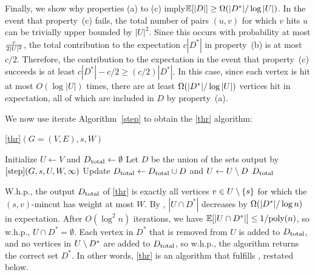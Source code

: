 Finally, we show why properties (a) to (c) imply\linebreak $\mathbb E[|D|] \ge \Omega(|D^*|/\log|U|)$. In the event that property~(c) fails, the total number of pairs $(u,v)$ for which $v$ hits $u$ can be trivially upper bounded by $|U|^2$. Since this occurs with probability at most $\frac c{2|U|^2}$, the total contribution to the expectation $c|D^*|$ in property~(b) is at most $c/2$. Therefore, the contribution to the expectation in the event that property~(c) succeeds is at least $c|D^*|-c/2\ge (c/2)|D^*|$. In this case, since each vertex is hit at most $O(\log|U|)$ times, there are at least $\Omega(|D^*|/\log|U|)$ vertices hit in expectation, all of which are included in $D$ by property~(a).
\EP


We now use iterate Algorithm~\ref{step} to obtain the \ref{thr} algorithm:

\begin{algorithm}
\caption{\ref{thr}$(G=(V,E),s, W)$}
\begin{algorithmic}[1]
\State Initialize $U\gets V$ and $D_{\textup{total}}\gets\emptyset$
 \State Let $D$ be the union of the sets output by $\ref{step}(G,s,U, W,\infty)$
 \State Update $D_{\textup{total}}\gets D_{\textup{total}}\cup D$ and $U\gets U\setminus D$
\EndFor
\State\Return $D_{\textup{total}}$
\end{algorithmic}
\end{algorithm}


\BC{}
W.h.p., the output $D_{\textup{total}}$ of \ref{thr} is exactly all vertices $v\in U\setminus \{s\}$ for which the $(s,v)$-mincut has weight at most $ W$. 
\EC
\BP
By , $|U\cap D^*|$ decreases by $\Omega(|D^*|/\log n)$ in expectation. After $O(\log^2n)$ iterations, we have $\mathbb E[|U\cap D^*|] \le 1/\textup{poly}(n)$, so w.h.p., $U\cap D^*=\emptyset$. Each vertex in $D^*$ that is removed from $U$ is added to $D_{\textup{total}}$, and no vertices in $U\setminus D^*$ are added to $D_{\textup{total}}$, so w.h.p., the algorithm returns the correct set $D^*$.
\EP
In other words, \ref{thr} is an algorithm that fulfills , restated below.
\Thr*

